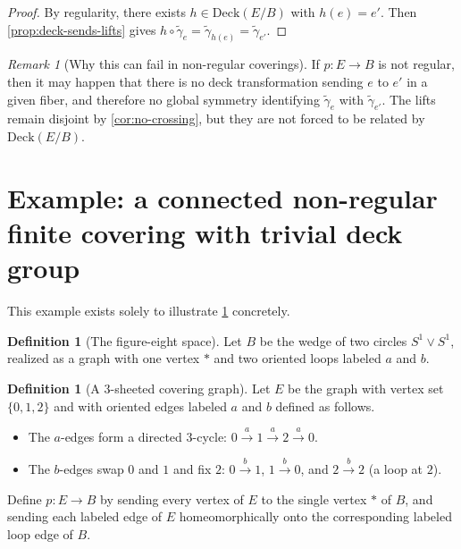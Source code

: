 \documentclass[11pt,a4paper]{article}
\theoremstyle{definition}
\newtheorem{definition}[theorem]{Definition}
\theoremstyle{remark}
\newtheorem{remark}[theorem]{Remark}
\begin{document}
\begin{proof}
By regularity, there exists \(h\in \mathrm{Deck}(E/B)\) with \(h(e)=e'\). Then \cref{prop:deck-sends-lifts} gives \(h\circ\tilde\gamma_e=\tilde\gamma_{h(e)}=\tilde\gamma_{e'}\).
\end{proof}

\begin{remark}[Why this can fail in non-regular coverings]
\label{rem:nonregular-fail}
If \(p:E\to B\) is not regular, then it may happen that there is no deck transformation sending \(e\) to \(e'\) in a given fiber, and therefore no global symmetry identifying \(\tilde\gamma_e\) with \(\tilde\gamma_{e'}\). The lifts remain disjoint by \cref{cor:no-crossing}, but they are not forced to be related by \(\mathrm{Deck}(E/B)\).
\end{remark}

\section{Example: a connected non-regular finite covering with trivial deck group}
\label{sec:nonregular-example}

This example exists solely to illustrate \cref{rem:nonregular-fail} concretely.

\begin{definition}[The figure-eight space]
\label{def:figure-eight}
Let \(B\) be the wedge of two circles \(S^1\vee S^1\), realized as a graph with one vertex \(*\) and two oriented loops labeled \(a\) and \(b\).
\end{definition}

\begin{definition}[A \(3\)-sheeted covering graph]
\label{def:three-sheet-cover}
Let \(E\) be the graph with vertex set \(\{0,1,2\}\) and with oriented edges labeled \(a\) and \(b\) defined as follows.
\begin{itemize}
  \item The \(a\)-edges form a directed \(3\)-cycle: \(0\xrightarrow{a}1\xrightarrow{a}2\xrightarrow{a}0\).
  \item The \(b\)-edges swap \(0\) and \(1\) and fix \(2\): \(0\xrightarrow{b}1\), \(1\xrightarrow{b}0\), and \(2\xrightarrow{b}2\) (a loop at \(2\)).
\end{itemize}
Define \(p:E\to B\) by sending every vertex of \(E\) to the single vertex \(*\) of \(B\), and sending each labeled edge of \(E\) homeomorphically onto the corresponding labeled loop edge of \(B\).
\end{definition}
\end{document}
